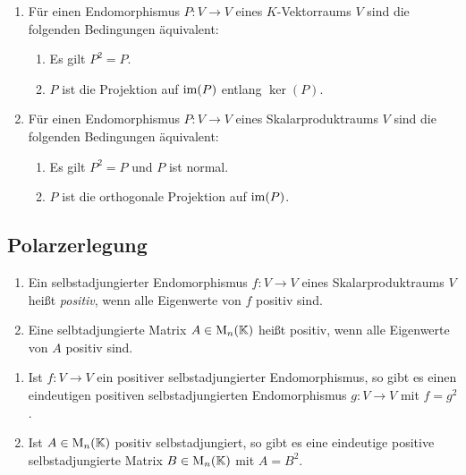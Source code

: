 \begin{proposition}
  \begin{enumerate}[leftmargin=*, label=\roman*)]
    \item
      Für einen Endomorphismus $P \colon V \to V$ eines $K$-Vektorraums $V$ sind die folgenden Bedingungen äquivalent:
      \begin{enumerate}[leftmargin=*, label=\alph*)]
        \item
          Es gilt $P^2 = P$.
        \item
          $P$ ist die Projektion auf $\operatorname{im}(P)$ entlang $\ker(P)$.
      \end{enumerate}
    \item
      Für einen Endomorphismus $P \colon V \to V$ eines Skalarproduktraums $V$ sind die folgenden Bedingungen äquivalent:
      \begin{enumerate}[leftmargin=*, label=\alph*)]
        \item
          Es gilt $P^2 = P$ und $P$ ist normal.
        \item
          $P$ ist die orthogonale Projektion auf $\operatorname{im}(P)$.
      \end{enumerate}
  \end{enumerate}
\end{proposition}












\subsection{Polarzerlegung}


\begin{definition}
  \begin{enumerate}[leftmargin=*, label=\roman*)]
    \item
      Ein selbstadjungierter Endomorphismus $f \colon V \to V$ eines Skalarproduktraums $V$ heißt \emph{positiv}, wenn alle Eigenwerte von $f$ positiv sind.
    \item
      Eine selbtadjungierte Matrix $A \in \mathrm{M}_n(\mathbb{K})$ heißt positiv, wenn alle Eigenwerte von $A$ positiv sind.
  \end{enumerate}
\end{definition}


\begin{proposition}
  \begin{enumerate}
    \item
      Ist $f \colon V \to V$ ein positiver selbstadjungierter Endomorphismus, so gibt es einen eindeutigen positiven selbstadjungierten Endomorphismus $g \colon V \to V$ mit $f = g^2$.
    \item
      Ist $A \in \mathrm{M}_n(\mathbb{K})$ positiv selbstadjungiert, so gibt es eine eindeutige positive selbstadjungierte Matrix $B \in \mathrm{M}_n(\mathbb{K})$ mit $A = B^2$.
  \end{enumerate}
\end{proposition}



